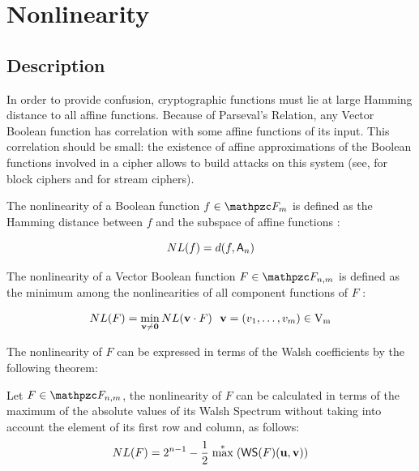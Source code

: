 \section{Nonlinearity}\label{sec:Nonlinearity}

\subsection{Description}

In order to provide confusion, cryptographic functions must lie at large Hamming distance to all affine functions. Because of Parseval's Relation, any Vector Boolean function has correlation with some affine functions of its input. This correlation should be small: the existence of affine approximations of the Boolean functions involved in a cipher allows to build attacks on this system (see, \cite{Matsui:93} for block ciphers and \cite{DingXS:91} for stream ciphers).

\begin{definition}
The nonlinearity of a Boolean function $f \in \funct{F}_{m}$ is defined as the Hamming distance between $f$ and the subspace of affine functions \cite{PieprzykF:88}:

\begin{equation}\label{NonlinearityBooleanFunction}
    \crit{NL}(f)=d(f,\set{A}_n) 
\end{equation}

\end{definition}

\begin{definition}
The nonlinearity of a Vector Boolean function $F \in \funct{F}_{n,m}$ is defined as the minimum among the nonlinearities of all component functions of $F$ \cite{Nyberg:92}:

\begin{equation}\label{NonlinearityVectorBooleanFunction}
    \crit{NL}(F)=\min_{\vec{v} \neq \vec{0}} \crit{NL}(\vec{v} \cdot F) \ \ \vec{v}=(v_1,\dots,v_m) \in \gf{V_m} 
\end{equation}

\end{definition}

The nonlinearity of $F$ can be expressed in terms of the Walsh coefficients by the following theorem:

\begin{theorem}
Let $F \in \funct{F}_{n,m}$, the nonlinearity of $F$ can be calculated in terms of the maximum of the absolute values of its Walsh Spectrum without taking into account the element of its first row and column, as follows:
\begin{equation}
    \crit{NL}(F) = 2^{n-1}-\frac{1}{2} \stackrel{*}{\max}(\matr{WS}(F)(\vec{u},\vec{v})) 
\end{equation}
\end{theorem}

